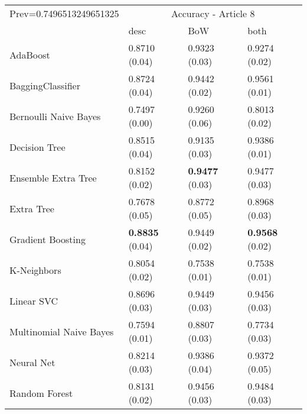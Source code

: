\begin{tabular}{|l|l|l|l| }
\hline
Prev=0.7496513249651325 &  \multicolumn{3}{c|}{Accuracy - Article 8} \\
\cline{2-4} & desc & BoW & both \\ \hline
AdaBoost                & 0.8710 (0.04) & 0.9323 (0.03) & 0.9274 (0.02)\\
BaggingClassifier       & 0.8724 (0.04) & 0.9442 (0.02) & 0.9561 (0.01)\\
Bernoulli Naive Bayes   & 0.7497 (0.00) & 0.9260 (0.06) & 0.8013 (0.02)\\
Decision Tree           & 0.8515 (0.04) & 0.9135 (0.03) & 0.9386 (0.01)\\
Ensemble Extra Tree     & 0.8152 (0.02) & {\bf 0.9477} (0.03) & 0.9477 (0.03)\\
Extra Tree              & 0.7678 (0.05) & 0.8772 (0.05) & 0.8968 (0.03)\\
Gradient Boosting       & {\bf 0.8835} (0.04) & 0.9449 (0.02) & {\bf 0.9568} (0.02)\\
K-Neighbors             & 0.8054 (0.02) & 0.7538 (0.01) & 0.7538 (0.01)\\
Linear SVC              & 0.8696 (0.03) & 0.9449 (0.03) & 0.9456 (0.03)\\
Multinomial Naive Bayes & 0.7594 (0.01) & 0.8807 (0.03) & 0.7734 (0.03)\\
Neural Net              & 0.8214 (0.03) & 0.9386 (0.04) & 0.9372 (0.05)\\
Random Forest           & 0.8131 (0.02) & 0.9456 (0.03) & 0.9484 (0.03)\\
\hline
\end{tabular}